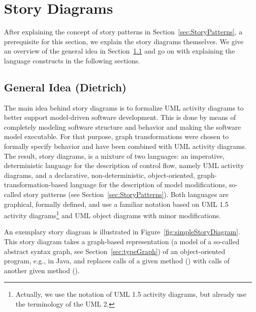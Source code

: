 \section{Story Diagrams} \label{sec:StoryDiagrams}

After explaining the concept of story patterns in Section~\ref{sec:StoryPatterns}, a prerequisite for this section, we explain the story diagrams themselves.
We give an overview of the general idea in Section~\ref{sec:IdeaStoryDiagrams} and go on with explaining the language constructs in the following sections.

\subsection{General Idea (Dietrich)}\label{sec:IdeaStoryDiagrams}


The main idea behind story diagrams is to formalize UML activity diagrams
to better support model-driven software development.
This is done by means of completely modeling software structure and behavior and making the software model executable.
For that purpose, graph transformations were chosen to formally specify behavior and have been combined with UML activity diagrams.
The result, story diagrams, is a mixture of two languages:
an imperative, deterministic language for the description of control flow, namely UML activity diagrams,
and a declarative, non-deterministic, object-oriented, graph-transformation-based language for the description of model modifications, so-called story patterns (see Section~\ref{sec:StoryPatterns}).
Both languages are graphical, formally defined, and use a familiar notation based on UML 1.5 activity diagrams\footnote{Actually,
we use the notation of UML 1.5 activity diagrams, but already use the terminology of the UML 2.}
and UML object diagrams with minor modifications.

An exemplary story diagram is illustrated in Figure~\ref{fig:simpleStoryDiagram}.
This story diagram takes a graph-based representation (a model of a so-called abstract syntax graph, see Section~\ref{sec:typeGraph}) of an object-oriented program, e.g., in Java,
and replaces calls of a given method () with calls of another given method ().

